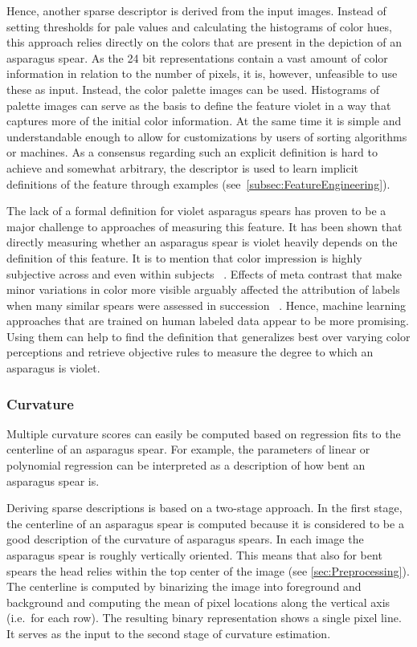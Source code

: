 Hence, another sparse descriptor is derived from the input images. Instead of setting thresholds for pale values and calculating the histograms of color hues, this approach relies directly on the colors that are present in the depiction of an asparagus spear. As the 24 bit representations contain a vast amount of color information in relation to the number of pixels, it is, however, unfeasible to use these as input. Instead, the color palette images can be used. Histograms of palette images can serve as the basis to define the feature violet in a way that captures more of the initial color information. At the same time it is simple and understandable enough to allow for customizations by users of sorting algorithms or machines. As a consensus regarding such an explicit definition is hard to achieve and somewhat arbitrary, the descriptor is used to learn implicit definitions of the feature through examples (see~\autoref{subsec:FeatureEngineering}).

\bigskip
The lack of a formal definition for violet asparagus spears has proven to be a major challenge to approaches of measuring this feature. It has been shown that directly measuring whether an asparagus spear is violet heavily depends on the definition of this feature. It is to mention that color impression is highly subjective across and even within subjects ~\citep{luo2000review}. Effects of meta contrast that make minor variations in color more visible arguably affected the attribution of labels when many similar spears were assessed in succession ~\citep{reeves1981metacontrast}. Hence, machine learning approaches that are trained on human labeled data appear to be more promising. Using them can help to find the definition that generalizes best over varying color perceptions and retrieve objective rules to measure the degree to which an asparagus is violet.



\subsubsection{Curvature}
\label{subsec:Curvature}

Multiple curvature scores can easily be computed based on regression fits to the centerline of an asparagus spear. For example, the parameters of linear or polynomial regression can be interpreted as a description of how bent an asparagus spear is. 

\bigskip
Deriving sparse descriptions is based on a two-stage approach. In the first stage, the centerline of an asparagus spear is computed because it is considered to be a good description of the curvature of asparagus spears. In each image the asparagus spear is roughly vertically oriented. This means that also for bent spears the head relies within the top center of the image (see \autoref{sec:Preprocessing}). The centerline is computed by binarizing the image into foreground and background and computing the mean of pixel locations along the vertical axis (i.e.\ for each row). The resulting binary representation shows a single pixel line. It serves as the input to the second stage of curvature estimation.

